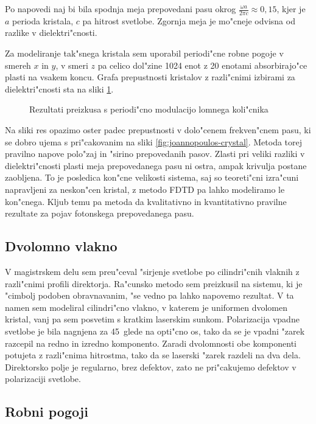 \documentclass[a4paper,10pt]{article}
\begin{document}
Po napovedi naj bi bila spodnja meja prepovedani pasu okrog $\frac{\omega a}{2\pi c} \approx 0,\!15$, kjer je $a$ perioda kristala, $c$ pa hitrost svetlobe. 
Zgornja meja je mo"cneje odvisna od razlike v dielektri"cnosti\cite{joannopoulos}. 

Za modeliranje tak"snega kristala sem uporabil periodi"cne robne pogoje v smereh $x$ in $y$, v smeri $z$ pa celico dol"zine 1024 enot z 20 enotami absorbirajo"ce plasti na vsakem koncu. 
Grafa prepustnosti kristalov z razli"cnimi izbirami za dielektri"cnosti sta na sliki \ref{fig:test-periodic}. 

\begin{figure}[h]
 
 \caption{Rezultati preizkusa s periodi"cno modulacijo lomnega koli"cnika}
 \label{fig:test-periodic}
\end{figure}

Na sliki res opazimo oster padec prepustnosti v dolo"cenem frekven"cnem pasu, ki se dobro ujema s pri"cakovanim na sliki \ref{fig:joannopoulos-crystal}. 
Metoda torej pravilno napove polo"zaj in "sirino prepovedanih pasov. 
Zlasti pri veliki razliki v dielektri"cnosti plasti meja prepovedanega pasu ni ostra, ampak krivulja postane zaobljena. 
To je posledica kon"cne velikosti sistema, saj so teoreti"cni izra"cuni napravljeni za neskon"cen kristal, z metodo \acs{FDTD} pa lahko modeliramo le kon"cnega. 
Kljub temu pa metoda da kvalitativno in kvantitativno pravilne rezultate za pojav fotonskega prepovedanega pasu. 

\subsection{Dvolomno vlakno}
V magistrskem delu sem preu"ceval "sirjenje svetlobe po cilindri"cnih vlaknih z razli"cnimi profili direktorja. 
Ra"cunsko metodo sem preizkusil na sistemu, ki je "cimbolj podoben obravnavanim, "se vedno pa lahko napovemo rezultat. 
V ta namen sem modeliral cilindri"cno vlakno, v katerem je uniformen dvolomen kristal, vanj pa sem posvetim s kratkim laserskim sunkom. 
Polarizacija vpadne svetlobe je bila nagnjena za 45\degree~glede na opti"cno os, tako da se je vpadni "zarek razcepil na redno in izredno komponento. 
Zaradi dvolomnosti obe komponenti potujeta z razli"cnima hitrostma, tako da se laserski "zarek razdeli na dva dela. 
Direktorsko polje je regularno, brez defektov, zato ne pri"cakujemo defektov v polarizaciji svetlobe. 


\newpage
\subsection{Robni pogoji}
\end{document}
